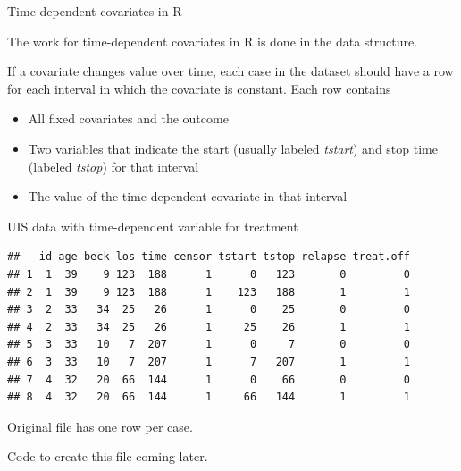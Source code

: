 \documentclass[ignorenonframetext,]{beamer}
\begin{document}
\begin{frame}{%
\protect\hypertarget{time-dependent-covariates-in-r}{%
Time-dependent covariates in R}}

The work for time-dependent covariates in \textsf{R} is done in the data
structure.

If a covariate changes value over time, each case in the dataset should
have a row for each interval in which the covariate is constant. Each
row contains

\begin{itemize}
\item
  All fixed covariates and the outcome
\item
  Two variables that indicate the start (usually labeled \emph{tstart})
  and stop time (labeled \emph{tstop}) for that interval
\item
  The value of the time-dependent covariate in that interval
\end{itemize}

\end{frame}

\begin{frame}[fragile]{%
\protect\hypertarget{uis-data-with-time-dependent-variable-for-treatment}{%
UIS data with time-dependent variable for treatment}}

\footnotesize

\begin{verbatim}
##   id age beck los time censor tstart tstop relapse treat.off
## 1  1  39    9 123  188      1      0   123       0         0
## 2  1  39    9 123  188      1    123   188       1         1
## 3  2  33   34  25   26      1      0    25       0         0
## 4  2  33   34  25   26      1     25    26       1         1
## 5  3  33   10   7  207      1      0     7       0         0
## 6  3  33   10   7  207      1      7   207       1         1
## 7  4  32   20  66  144      1      0    66       0         0
## 8  4  32   20  66  144      1     66   144       1         1
\end{verbatim}

\normalsize

Original file has one row per case.

Code to create this file coming later.

\end{frame}
\end{document}
